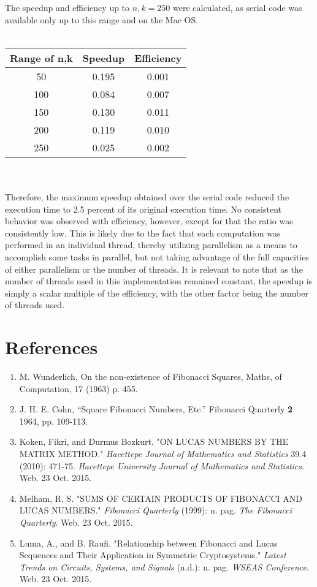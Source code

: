 \documentclass[11pt]{article}
\begin{document}
The speedup and efficiency up to $n,k=250$ were calculated, as serial code was available only up to this range and on the Mac OS.
\\ \\
\begin{tabular}{ccc}
\hline
 Range of n,k & Speedup  & Efficiency \\ \hline
50 & 0.195 & 0.001\\
100 & 0.084 & 0.007 \\
150 & 0.130 & 0.011 \\
200 & 0.119 & 0.010 \\
250 & 0.025 & 0.002 \\ 
 \hline \hline
\end{tabular} \\ \\
Therefore, the maximum speedup obtained over the serial code reduced the execution time to 2.5 percent of its original execution time. No consistent behavior was observed with efficiency, however, except for that the ratio was consistently low. This is likely due to the fact that each computation was performed in an individual thread, thereby utilizing parallelism as a means to accomplish some tasks in parallel, but not taking advantage of the full capacities of either parallelism or the number of threads. It is relevant to note that as the number of threads used in this implementation remained constant, the speedup is simply a scalar multiple of the efficiency, with the other factor being the number of threads used.

\section{References}

\begin{enumerate}
\item M. Wunderlich, On the non-existence of Fibonacci Squares, Maths, of Computation, 17 (1963) p. 455. 

\item J. H. E. Cohn, ``Square Fibonacci Numbers, Etc.'' Fibonacci Quarterly \textbf{2} 1964, pp. 109-113.

\item Koken, Fikri, and Durmus Bozkurt. "ON LUCAS NUMBERS BY THE MATRIX METHOD." \textit{Hacettepe Journal of Mathematics and Statistics} 39.4 (2010): 471-75. \textit{Hacettepe University Journal of Mathematics and Statistics}. Web. 23 Oct. 2015.

\item Melham, R. S. "SUMS OF CERTAIN PRODUCTS OF FIBONACCI AND LUCAS NUMBERS." \textit{Fibonacci Quarterly} (1999): n. pag. \textit{The Fibonacci Quarterly}. Web. 23 Oct. 2015.

\item Luma, A., and B. Raufi. "Relationship between Fibonacci and Lucas Sequences and Their Application in Symmetric Cryptosystems." \textit{Latest Trends on Circuits, Systems, and Signals} (n.d.): n. pag. \textit{WSEAS Conference}. Web. 23 Oct. 2015.
\end{enumerate}
\end{document}
